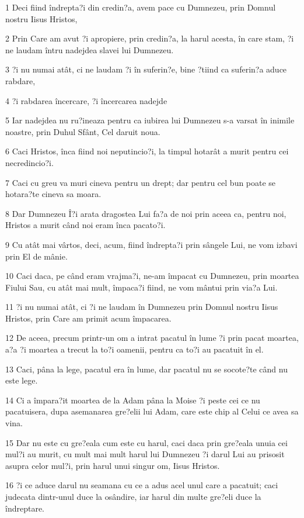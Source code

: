 \par 1 Deci fiind îndrepta?i din credin?a, avem pace cu Dumnezeu, prin Domnul nostru Iisus Hristos,
\par 2 Prin Care am avut ?i apropiere, prin credin?a, la harul acesta, în care stam, ?i ne laudam întru nadejdea slavei lui Dumnezeu.
\par 3 ?i nu numai atât, ci ne laudam ?i în suferin?e, bine ?tiind ca suferin?a aduce rabdare,
\par 4 ?i rabdarea încercare, ?i încercarea nadejde
\par 5 Iar nadejdea nu ru?ineaza pentru ca iubirea lui Dumnezeu s-a varsat în inimile noastre, prin Duhul Sfânt, Cel daruit noua.
\par 6 Caci Hristos, înca fiind noi neputincio?i, la timpul hotarât a murit pentru cei necredincio?i.
\par 7 Caci cu greu va muri cineva pentru un drept; dar pentru cel bun poate se hotara?te cineva sa moara.
\par 8 Dar Dumnezeu Î?i arata dragostea Lui fa?a de noi prin aceea ca, pentru noi, Hristos a murit când noi eram înca pacato?i.
\par 9 Cu atât mai vârtos, deci, acum, fiind îndrepta?i prin sângele Lui, ne vom izbavi prin El de mânie.
\par 10 Caci daca, pe când eram vrajma?i, ne-am împacat cu Dumnezeu, prin moartea Fiului Sau, cu atât mai mult, împaca?i fiind, ne vom mântui prin via?a Lui.
\par 11 ?i nu numai atât, ci ?i ne laudam în Dumnezeu prin Domnul nostru Iisus Hristos, prin Care am primit acum împacarea.
\par 12 De aceea, precum printr-un om a intrat pacatul în lume ?i prin pacat moartea, a?a ?i moartea a trecut la to?i oamenii, pentru ca to?i au pacatuit în el.
\par 13 Caci, pâna la lege, pacatul era în lume, dar pacatul nu se socote?te când nu este lege.
\par 14 Ci a împara?it moartea de la Adam pâna la Moise ?i peste cei ce nu pacatuisera, dupa asemanarea gre?elii lui Adam, care este chip al Celui ce avea sa vina.
\par 15 Dar nu este cu gre?eala cum este cu harul, caci daca prin gre?eala unuia cei mul?i au murit, cu mult mai mult harul lui Dumnezeu ?i darul Lui au prisosit asupra celor mul?i, prin harul unui singur om, Iisus Hristos.
\par 16 ?i ce aduce darul nu seamana cu ce a adus acel unul care a pacatuit; caci judecata dintr-unul duce la osândire, iar harul din multe gre?eli duce la îndreptare.
